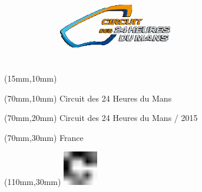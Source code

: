 \null\newpage
\begin{textblock*}{50mm}(15mm,10mm)%
\includegraphics[width=50mm]{LG/LEM.png}
\end{textblock*}
\begin{textblock*}{130mm}(70mm,10mm)%
{\fontsize{20}{20}\selectfont Circuit des 24 Heures du Mans}\\
\end{textblock*}
\begin{textblock*}{120mm}(70mm,20mm)%
{\fontsize{16}{16}\selectfont Circuit des 24 Heures du Mans / 2015}\\
\end{textblock*}
\begin{textblock*}{120mm}(70mm,30mm)%
{\fontsize{12}{12}\selectfont France}
\end{textblock*}
\begin{textblock*}{30mm}(110mm,30mm)%
\centering
\includegraphics[height=15mm]{icons/fa-rotate-right.pdf}
\end{textblock*}
